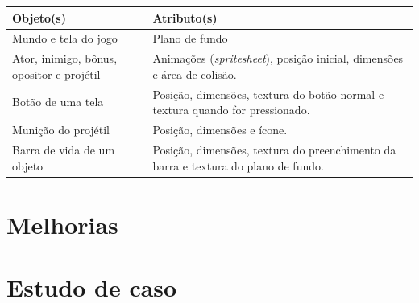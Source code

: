 \documentclass{beamer}
\begin{document}
   \begin{frame}
      \begin{center}
         \begin{tabular}{p{12em} | p{12em}}
            \textbf{Objeto(s)} & \textbf{Atributo(s)} \\
            \hline
            Mundo e tela do jogo & Plano de fundo \\
            \hline
            Ator, inimigo, bônus, opositor e projétil & Animações (\emph{spritesheet}), posição inicial, dimensões e área de colisão. \\
            \hline
            Botão de uma tela & Posição, dimensões, textura do botão normal e textura quando for pressionado.\\
            \hline
            Munição do projétil & Posição, dimensões e ícone. \\
            \hline
            Barra de vida de um objeto & Posição, dimensões, textura do preenchimento da barra e textura do plano de fundo. \\
         \end{tabular}
      \end{center}
   \end{frame}

   \section{Melhorias}

   \section{Estudo de caso}
\end{document}
